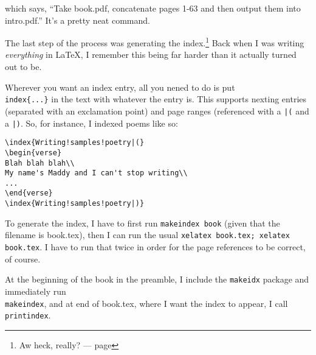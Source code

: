 \begin{paracol}{2}
\begin{leftcolumn}
which says, ``Take book.pdf, concatenate pages 1-63 and then output them into intro.pdf.'' It's a pretty neat command.


The last step of the process was generating the index.\footnote{Aw heck, really? --- page \pageref{indexmunge}} Back when I was writing \emph{everything} in \LaTeX, I remember this being far harder than it actually turned out to be.

Wherever you want an index entry, all you nened to do is put \texttt{\\index\{...\}} in the text with whatever the entry is. This supports nexting entries (separated with an exclamation point) and page ranges (referenced with a \texttt{|(} and a \texttt{|)}. So, for instance, I indexed poems like so:

\begin{verbatim}
\index{Writing!samples!poetry|(}
\begin{verse}
Blah blah blah\\
My name's Maddy and I can't stop writing\\
...
\end{verse}
\index{Writing!samples!poetry|)}
\end{verbatim}

To generate the index, I have to first run \texttt{makeindex book} (given that the filename is book.tex), then I can run the usual \texttt{xelatex book.tex; xelatex book.tex}. I have to run that twice in order for the page references to be correct, of course.

At the beginning of the book in the preamble, I include the \texttt{makeidx} package and immediately run \texttt{\\makeindex}, and at end of book.tex, where I want the index to appear, I call \texttt{\\printindex}.
\newpage
\end{leftcolumn}
\end{paracol}

